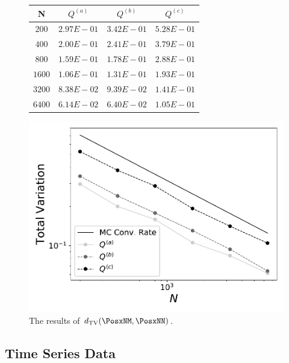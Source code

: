 \begin{frame}[t]
\small
\begin{figure}[h]
\begin{table}[H]
\begin{tabular}{ c | c | c | c }

N & $Q^{(a)}$ & $Q^{(b)}$ & $Q^{(c)}$\\ \hline \hline
$200$ & $2.97E-01$ & $3.42E-01$ & $5.28E-01$\\ \hline

$400$ & $2.00E-01$ & $2.41E-01$ & $3.79E-01$\\ \hline

$800$ & $1.59E-01$ & $1.78E-01$ & $2.88E-01$\\ \hline

$1600$ & $1.06E-01$ & $1.31E-01$ & $1.93E-01$\\ \hline

$3200$ & $8.38E-02$ & $9.39E-02$ & $1.41E-01$\\ \hline

$6400$ & $6.14E-02$ & $6.40E-02$ & $1.05E-01$\\ \hline

\end{tabular}
\end{table}

		\includegraphics[width=0.5\linewidth]{./images/Plot-reg_BigN_40000_reg_M_1_rand_I_100000}

\caption{The results of $d_\text{TV}(\PosxNM, \PosxNN)$.}
\label{fig:skew}
\end{figure}
\end{frame}

\subsection{Time Series Data}

